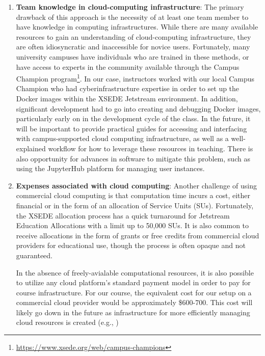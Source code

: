 \begin{enumerate}

\item {\bf Team knowledge in cloud-computing infrastructure}: The primary drawback of
this approach is the necessity of at least one team member to have knowledge
in computing infrastructures. While there are many available resources to gain an
understanding of cloud-computing infrastructure, they are often idiosyncratic and
inaccessible for novice users. Fortunately, many university campuses
have individuals who are trained in these methods, or have access to experts in
the community available through the Campus Champion program\footnote{\url{https://www.xsede.org/web/campus-champions}}.
In our case, instructors worked with our local Campus Champion who had
cyberinfrastructure expertise in order to set up the Docker images within
the XSEDE Jetstream environment. In addition, significant development had to go
into creating and debugging Docker images, particularly early on in the
development cycle of the class. In the future, it will be important to provide
practical guides for accessing and interfacing with campus-supported cloud computing infrastructure, as
well as a well-explained workflow for how to leverage these resources in
teaching. There is also opportunity for advances in software to mitigate this
problem, such as using the JupyterHub \cite{perez2015project} platform
for managing user instances.

\item {\bf Expenses associated with cloud computing}: Another challenge of using
commercial cloud computing is that computation time incurs a cost, either
financial or in the form of an allocation of Service Units (SUs).
Fortunately, the XSEDE allocation process has a quick
turnaround for Jetstream Education Allocations with a limit up to 50,000 SUs.
It is also common to receive allocations in the form of grants or free credits
from commercial cloud providers for educational use, though the process is often
opaque and not guaranteed.

In the absence of freely-avialable computational resources, it is also
possible to utilize any cloud platform's standard payment model in order
to pay for course infrastructure. For our course, the equivalent cost
for our setup on a commercial cloud provider would be approximately \$600-700.
This cost will likely go down in the future as infrastructure for more efficiently
managing cloud resources is created (e.g., \cite{perez2015project})


\end{enumerate}
